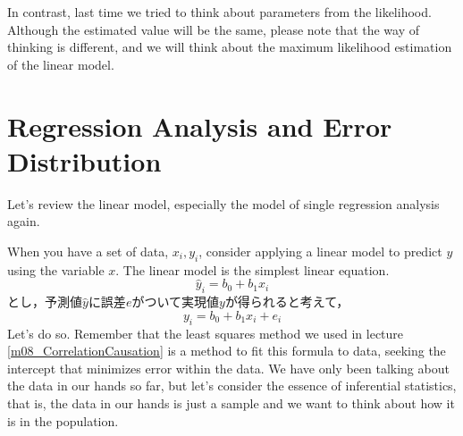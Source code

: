 \documentclass{ltjbook}
\begin{document}
In contrast, last time we tried to think about parameters from the likelihood. Although the estimated value will be the same, please note that the way of thinking is different, and we will think about the maximum likelihood estimation of the linear model.

\section{Regression Analysis and Error Distribution}
Let's review the linear model, especially the model of single regression analysis again.

When you have a set of data, $x_i, y_i$, consider applying a linear model to predict $y$ using the variable $x$. The linear model is the simplest linear equation.
\[\hat{y}_i = b_0 + b_1 x_i \]
とし，予測値$\hat{y}$に誤差$e$がついて実現値$y$が得られると考えて，
\[ y_i= b_0 + b_1 x_i + e_i  \]
Let's do so. Remember that the least squares method we used in lecture \ref{m08_CorrelationCausation} is a method to fit this formula to data, seeking the intercept that minimizes error within the data. We have only been talking about the data in our hands so far, but let's consider the essence of inferential statistics, that is, the data in our hands is just a sample and we want to think about how it is in the population.
\end{document}
